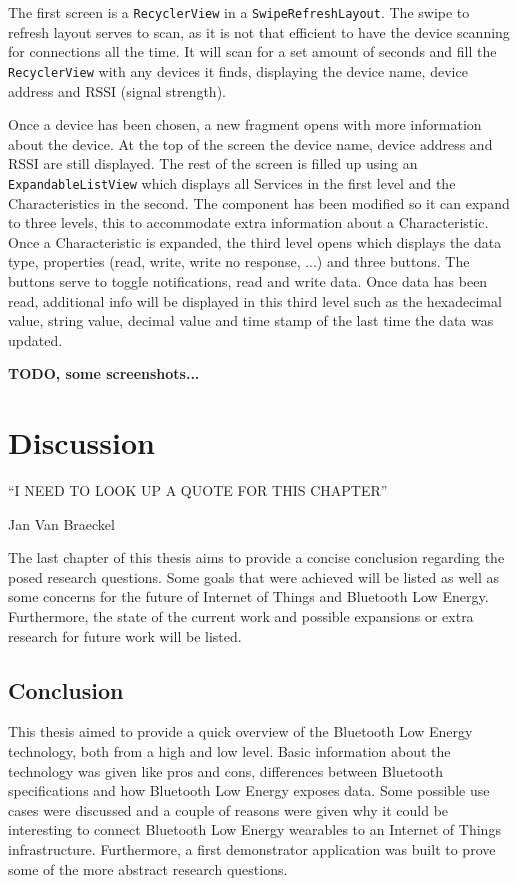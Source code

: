 \documentclass[pdftex,a4paper,12pt,twoside]{report}
\begin{document}
The first screen is a \texttt{RecyclerView} in a \texttt{SwipeRefreshLayout}. The swipe to refresh layout serves to scan, as it is not that efficient to have the device scanning for connections all the time. It will scan for a set amount of seconds and fill the \texttt{RecyclerView} with any devices it finds, displaying the device name, device address and RSSI (signal strength).

Once a device has been chosen, a new fragment opens with more information about the device. At the top of the screen the device name, device address and RSSI are still displayed. The rest of the screen is filled up using an \texttt{ExpandableListView} which displays all Services in the first level and the Characteristics in the second. The component has been modified so it can expand to three levels, this to accommodate extra information about a Characteristic. Once a Characteristic is expanded, the third level opens which displays the data type, properties (read, write, write no response, ...) and three buttons. The buttons serve to toggle notifications, read and write data. Once data has been read, additional info will be displayed in this third level such as the hexadecimal value, string value, decimal value and time stamp of the last time the data was updated.

\textbf{TODO, some screenshots...}

\chapter{Discussion}
\label{ch:discussion}
\epigraph{``I NEED TO LOOK UP A QUOTE FOR THIS CHAPTER''}{Jan Van Braeckel}
The last chapter of this thesis aims to provide a concise conclusion regarding the posed research questions. Some goals that were achieved will be listed as well as some concerns for the future of Internet of Things and Bluetooth Low Energy. Furthermore, the state of the current work and possible expansions or extra research for future work will be listed.

\section{Conclusion}
\label{sec:conclusion}
This thesis aimed to provide a quick overview of the Bluetooth Low Energy technology, both from a high and low level. Basic information about the technology was given like pros and cons, differences between Bluetooth specifications and how Bluetooth Low Energy exposes data. Some possible use cases were discussed and a couple of reasons were given why it could be interesting to connect Bluetooth Low Energy wearables to an Internet of Things infrastructure. Furthermore, a first demonstrator application was built to prove some of the more abstract research questions.
\end{document}
